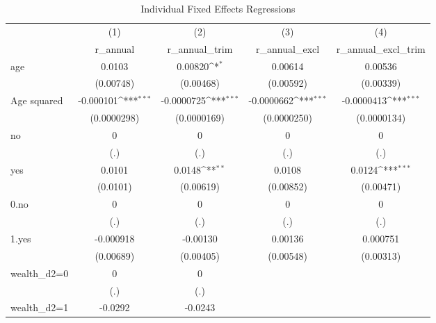 \begin{table}[htbp]\centering
\def\sym#1{\ifmmode^{#1}\else\(^{#1}\)\fi}
\caption{Individual Fixed Effects Regressions}
\begin{tabular}{l*{4}{c}}
\toprule
                &\multicolumn{1}{c}{(1)}&\multicolumn{1}{c}{(2)}&\multicolumn{1}{c}{(3)}&\multicolumn{1}{c}{(4)}\\
                &\multicolumn{1}{c}{r\_annual}&\multicolumn{1}{c}{r\_annual\_trim}&\multicolumn{1}{c}{r\_annual\_excl}&\multicolumn{1}{c}{r\_annual\_excl\_trim}\\
\midrule
age             &   0.0103         &  0.00820\sym{*}  &  0.00614         &  0.00536         \\
                &(0.00748)         &(0.00468)         &(0.00592)         &(0.00339)         \\
Age squared     &-0.000101\sym{***}&-0.0000725\sym{***}&-0.0000662\sym{***}&-0.0000413\sym{***}\\
                &(0.0000298)         &(0.0000169)         &(0.0000250)         &(0.0000134)         \\
no              &        0         &        0         &        0         &        0         \\
                &      (.)         &      (.)         &      (.)         &      (.)         \\
yes             &   0.0101         &   0.0148\sym{**} &   0.0108         &   0.0124\sym{***}\\
                & (0.0101)         &(0.00619)         &(0.00852)         &(0.00471)         \\
0.no            &        0         &        0         &        0         &        0         \\
                &      (.)         &      (.)         &      (.)         &      (.)         \\
1.yes           &-0.000918         & -0.00130         &  0.00136         & 0.000751         \\
                &(0.00689)         &(0.00405)         &(0.00548)         &(0.00313)         \\
wealth\_d2=0     &        0         &        0         &                  &                  \\
                &      (.)         &      (.)         &                  &                  \\
wealth\_d2=1     &  -0.0292         &  -0.0243         &                  &                  \\

\end{tabular}
\end{table}
